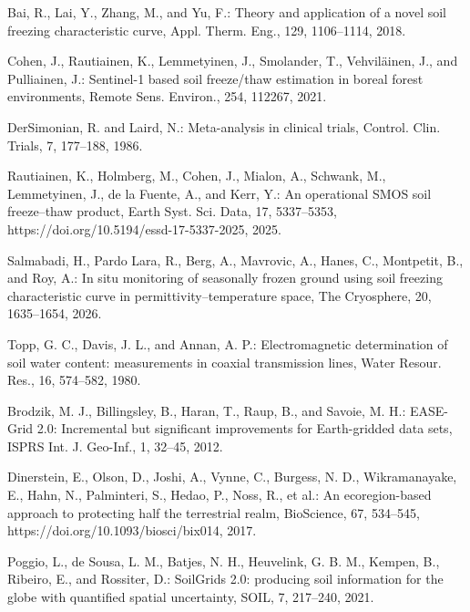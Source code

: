 \documentclass[essd,manuscript]{copernicus}
\begin{document}
\begin{thebibliography}{}
Bai, R., Lai, Y., Zhang, M., and Yu, F.: Theory and application of a novel soil
freezing characteristic curve, Appl. Therm. Eng., 129, 1106--1114, 2018.

Cohen, J., Rautiainen, K., Lemmetyinen, J., Smolander, T., Vehvil\"ainen, J.,
and Pulliainen, J.: Sentinel-1 based soil freeze/thaw estimation in boreal
forest environments, Remote Sens. Environ., 254, 112267, 2021.

DerSimonian, R. and Laird, N.: Meta-analysis in clinical trials, Control.
Clin. Trials, 7, 177--188, 1986.

Rautiainen, K., Holmberg, M., Cohen, J., Mialon, A., Schwank, M.,
Lemmetyinen, J., de la Fuente, A., and Kerr, Y.: An operational SMOS soil
freeze--thaw product, Earth Syst. Sci. Data, 17, 5337--5353,
https://doi.org/10.5194/essd-17-5337-2025, 2025.

Salmabadi, H., Pardo Lara, R., Berg, A., Mavrovic, A., Hanes, C., Montpetit, B.,
and Roy, A.: In situ monitoring of seasonally frozen ground using soil freezing
characteristic curve in permittivity--temperature space, The Cryosphere, 20,
1635--1654, 2026.

Topp, G. C., Davis, J. L., and Annan, A. P.: Electromagnetic determination of
soil water content: measurements in coaxial transmission lines, Water Resour.
Res., 16, 574--582, 1980.

Brodzik, M. J., Billingsley, B., Haran, T., Raup, B., and Savoie, M. H.:
EASE-Grid 2.0: Incremental but significant improvements for Earth-gridded data
sets, ISPRS Int. J. Geo-Inf., 1, 32--45, 2012.

Dinerstein, E., Olson, D., Joshi, A., Vynne, C., Burgess, N. D., Wikramanayake,
E., Hahn, N., Palminteri, S., Hedao, P., Noss, R., et al.: An ecoregion-based
approach to protecting half the terrestrial realm, BioScience, 67, 534--545,
https://doi.org/10.1093/biosci/bix014, 2017.

Poggio, L., de Sousa, L. M., Batjes, N. H., Heuvelink, G. B. M., Kempen, B.,
Ribeiro, E., and Rossiter, D.: SoilGrids 2.0: producing soil information for
the globe with quantified spatial uncertainty, SOIL, 7, 217--240, 2021.
\end{thebibliography}
\end{document}
